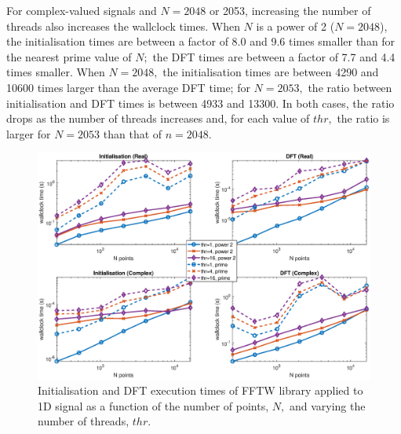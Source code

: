 \documentclass[a4paper]{article}
\begin{document}
For complex-valued signals and $N=2048$ or 2053, increasing the number
of threads also increases the wallclock times. When $N$ is a power of
2 ($N=2048$), the initialisation times are between a factor of 8.0 and
9.6 times smaller than for the nearest prime value of $N;$ the DFT
times are between a factor of 7.7 and 4.4 times smaller. When
$N=2048,$ the initialisation times are between 4290 and 10600 times
larger than the average DFT time; for $N=2053,$ the ratio between
initialisation and DFT times is between 4933 and 13300. In both cases,
the ratio drops as the number of threads increases and, for each value
of $thr,$ the ratio is larger for $N=2053$ than that of $n=2048.$



\begin{figure}[htb]
    \centering
    \includegraphics[width=\linewidth]{../results/fftw_1d_thr.eps}
  \caption{Initialisation and DFT execution times of FFTW library applied to 1D signal as a function of the
    number of points, $N,$ and varying the number of threads, $thr.$ }
  \label{1DFFTW}
\end{figure}
\end{document}

